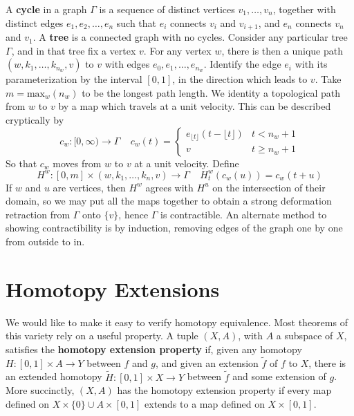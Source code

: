 \begin{example}
    A {\bf cycle} in a graph $\Gamma$ is a sequence of distinct vertices $v_1, \dots, v_n$, together with distinct edges $e_1, e_2, \dots, e_n$ such that $e_i$ connects $v_i$ and $v_{i+1}$, and $e_n$ connects $v_n$ and $v_1$. A {\bf tree} is a connected graph with no cycles. Consider any particular tree $\Gamma$, and in that tree fix a vertex $v$. For any vertex $w$, there is then a unique path $(w, k_1, \dots, k_{n_w}, v)$ to $v$ with edges $e_0, e_1, \dots, e_{n_w}$. Identify the edge $e_i$ with its parameterization by the interval $[0,1]$, in the direction which leads to $v$. Take $m = \text{max}_w(n_w)$ to be the longest path length. We identity a topological path from $w$ to $v$ by a map which travels at a unit velocity. This can be described cryptically by
    \[ c_w:[0,\infty) \to \Gamma\ \ \ \ \ c_w(t) = \begin{cases} e_{\lfloor t \rfloor}(t - \lfloor t \rfloor) & t < n_w + 1 \\ v & t \geq n_w + 1 \end{cases} \]
    So that $c_w$ moves from $w$ to $v$ at a unit velocity. Define
    \[ H^w: [0,m] \times (w, k_1, \dots, k_n, v) \to \Gamma\ \ \ \ \ H^w_t(c_w(u)) = c_w(t + u) \]
    If $w$ and $u$ are vertices, then $H^w$ agrees with $H^u$ on the intersection of their domain, so we may put all the maps together to obtain a strong deformation retraction from $\Gamma$ onto $\{ v \}$, hence $\Gamma$ is contractible. An alternate method to showing contractibility is by induction, removing edges of the graph one by one from outside to in.
\end{example}


\section{Homotopy Extensions}

We would like to make it easy to verify homotopy equivalence. Most theorems of this variety rely on a useful property. A tuple $(X,A)$, with $A$ a subspace of $X$, satisfies the {\bf homotopy extension property} if, given any homotopy $H: [0,1] \times A \to Y$ between $f$ and $g$, and given an extension $\tilde{f}$ of $f$ to $X$, there is an extended homotopy $\widetilde{H}: [0,1] \times X \to Y$ between $\tilde{f}$ and some extension of $g$. More succinctly, $(X,A)$ has the homotopy extension property if every map defined on $X \times \{ 0 \} \cup A \times [0,1]$ extends to a map defined on $X \times [0,1]$.

